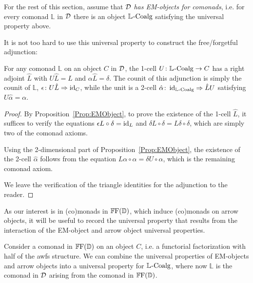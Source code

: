 For the rest of this section, assume that $\mathcal{D}$ \emph{has EM-objects for comonads}, i.e. for every comonad $\mathbb{L}$ in $\mathcal{D}$ there is an object $\mathbb{L}_{}\text{-}\mathrm{Coalg}$ satisfying the universal property above.

It is not too hard to use this universal property to construct the free/forgetful adjunction:

\begin{proposition}
	For any comonad $\mathbb{L}$ on an object $C$ in $\mathcal{D}$, the 1-cell $U\colon\mathbb{L}_{}\text{-}\mathrm{Coalg}\to C$ has a right adjoint $\hat{L}$ with $U\hat{L}=L$ and $\alpha\hat{L}=\delta$. The counit of this adjunction is simply the counit of $\mathbb{L}$, $\epsilon\colon U\hat{L}\Rightarrow\operatorname{id}_C$, while the unit is a 2-cell $\hat{\alpha}\colon\operatorname{id}_{\mathbb{L}_{}\text{-}\mathrm{Coalg}}\Rightarrow\hat{L}U$ satisfying $U\hat{\alpha}=\alpha$.
\end{proposition}
\begin{proof}
	By Proposition~\ref{Prop:EMObject}, to prove the existence of the 1-cell $\hat{L}$, it suffices to verify the equations $\epsilon L\circ\delta=\operatorname{id}_L$ and $\delta L\circ\delta=L\delta\circ\delta$, which are simply two of the comonad axioms.

	Using the 2-dimensional part of Proposition~\ref{Prop:EMObject}, the existence of the 2-cell $\hat{\alpha}$ follows from the equation $L\alpha\circ\alpha=\delta U\circ\alpha$, which is the remaining comonad axiom.

	We leave the verification of the triangle identities for the adjunction to the reader.
\end{proof}

As our interest is in (co)monads in $\mathbb{F}\mathrm{F}(\mathbb{D})$, which induce (co)monads on arrow objects, it will be useful to record the universal property that results from the interaction of the EM-object and arrow object universal properties.

Consider a comonad in $\mathbb{F}\mathrm{F}(\mathbb{D})$ on an object $C$, i.e. a functorial factorization with half of the awfs structure. We can combine the universal properties of EM-objects and arrow objects into a universal property for $\mathbb{L}_{}\text{-}\mathrm{Coalg}$, where now $\mathbb{L}$ is the comonad in $\mathcal{D}$ arising from the comonad in $\mathbb{F}\mathrm{F}(\mathbb{D})$.

